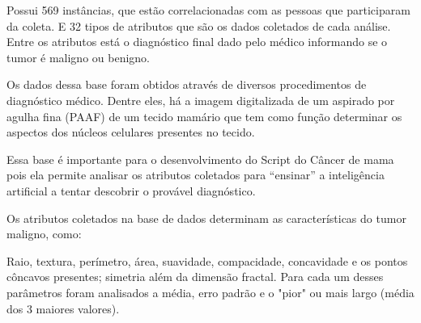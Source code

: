 Possui 569 instâncias, que estão correlacionadas com as pessoas que participaram da coleta. E 32 tipos de atributos que são os dados coletados de cada análise. Entre os atributos está o diagnóstico final dado pelo médico informando se o tumor é maligno ou benigno.

Os dados dessa base foram obtidos através de diversos procedimentos de diagnóstico médico. Dentre eles, há a imagem digitalizada de um aspirado por agulha fina (PAAF) de um tecido mamário que tem como função determinar os aspectos dos núcleos celulares presentes no tecido.

Essa base é importante para o desenvolvimento do Script do Câncer de mama pois ela permite analisar os atributos coletados para “ensinar” a inteligência artificial a tentar descobrir o provável diagnóstico.

Os atributos coletados na base de dados determinam as características do tumor maligno, como:

Raio, textura, perímetro, área, suavidade, compacidade, concavidade e os pontos côncavos presentes; simetria além da dimensão fractal. Para cada um desses parâmetros foram analisados a média, erro padrão e o "pior" ou mais largo (média dos 3 maiores valores).


